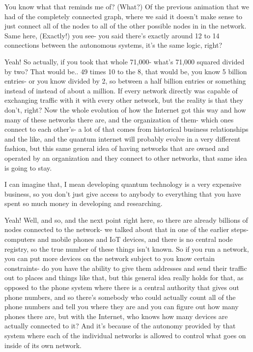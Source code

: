 You know what that reminds me of? (What?) Of the previous animation that we had of the completely connected graph, where we said it doesn't make sense to just connect all of the nodes to all of the other possible nodes in in the network. Same here, (Exactly!) you see- you said there's exactly around 12 to 14 connections between the autonomous systems, it's the same logic, right?

Yeah! So actually, if you took that whole 71,000- what's 71,000 squared divided by two? That would be.. 49 times 10 to the 8, that would be, you know 5 billion entries- or you know divided by 2, so between a half billion entries or something instead of instead of about a million. If every network directly was capable of exchanging traffic with it with every other network, but the reality is that they don't, right? Now the whole evolution of how the Internet got this way and how many of these networks there are, and the organization of them- which ones connect to each other's- a lot of that comes from historical business relationships and the like, and the quantum internet will probably evolve in a very different fashion, but this same general idea of having networks that are owned and operated by an organization and they connect to other networks, that same idea is going to stay.

I can imagine that, I mean developing quantum technology is a very expensive business, so you don't just give access to anybody to everything that you have spent so much money in developing and researching.

Yeah! Well, and so, and the next point right here, so there are already billions of nodes connected to the network- we talked about that in one of the earlier steps- computers and mobile phones and IoT devices, and there is no central node registry, so the true number of these things isn't known. So if you run a network, you can put more devices on the network subject to you know certain constraints- do you have the ability to give them addresses and send their traffic out to places and things like that, but this general idea really holds for that, as opposed to the phone system where there is a central authority that gives out phone numbers, and so there's somebody who could actually count all of the phone numbers and tell you where they are and you can figure out how many phones there are, but with the Internet, who knows how many devices are actually connected to it? And it's because of the autonomy provided by that system where each of the individual networks is allowed to control what goes on inside of its own network.

